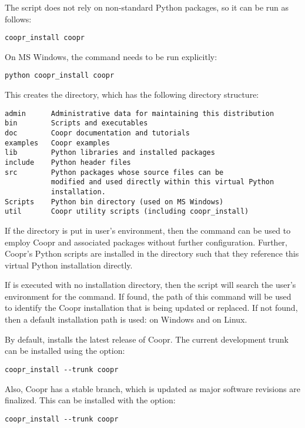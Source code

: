 The  script does not rely on non-standard Python packages, so it can be run as follows:
\begin{lstlisting}
coopr_install coopr
\end{lstlisting}
On MS Windows, the  command needs to be run explicitly:
\begin{lstlisting}
python coopr_install coopr
\end{lstlisting}
This creates the  directory, which has the following directory structure:
\begin{verbatim}
admin      Administrative data for maintaining this distribution
bin        Scripts and executables
doc        Coopr documentation and tutorials
examples   Coopr examples
lib        Python libraries and installed packages
include    Python header files
src        Python packages whose source files can be
           modified and used directly within this virtual Python
           installation.
Scripts    Python bin directory (used on MS Windows)
util       Coopr utility scripts (including coopr_install)
\end{verbatim}
If the  directory is put in user's  environment,
then the  command can be used to employ Coopr and
associated packages without further configuration.  Further, Coopr's 
Python scripts are installed in the  directory such that they 
reference this virtual Python installation directly.

If  is executed with no installation directory,
then the script will search the user's  environment for the
 command.  If found, the path of this command will be used
to identify the Coopr installation that is being updated or replaced.
If not found, then a default installation path is used:  
on Windows and  on Linux.

By default,  installs the latest release of Coopr.  
The current development trunk can be installed using the  option:
\begin{lstlisting}
coopr_install --trunk coopr
\end{lstlisting}
Also, Coopr has a stable branch, which is updated as major software
revisions are finalized.  This can be installed with the  option:
\begin{lstlisting}
coopr_install --trunk coopr
\end{lstlisting}

